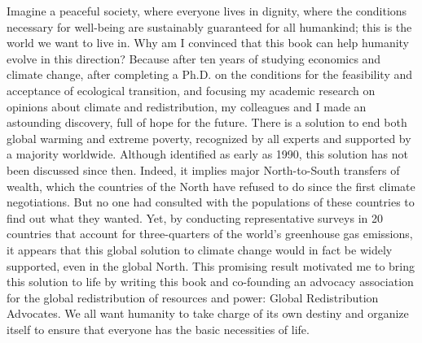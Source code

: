 \documentclass[a5paper,english,openany]{memoir}
\begin{document}
Imagine a peaceful society, where everyone lives in dignity, where the conditions necessary for well-being are sustainably guaranteed for all humankind; this is the world we want to live in.
Why am I convinced that this book can help humanity evolve in this direction? Because after ten years of studying economics and climate change, after completing a Ph.D. on the conditions for the feasibility and acceptance of ecological transition, %
and focusing my academic research on opinions about climate and redistribution, my colleagues and I made an astounding discovery, full of hope for the future. %
There is a solution to end both global warming and extreme poverty, recognized by all %
experts and supported by a majority worldwide. 
Although identified as early as 1990, this solution has not been discussed 
since then. Indeed, it implies major North-to-South %
transfers of wealth, which the countries of the North have refused to do since the first climate negotiations. But no one had consulted with the populations of these countries to find out what they wanted. Yet, %
by conducting representative surveys in 20 countries that account for three-quarters of the world's greenhouse gas emissions, it appears that this global solution to climate change would in fact be widely supported, even in the global North. 
This promising result motivated me to bring this solution to life by writing this book and co-founding an advocacy association for the global redistribution of resources and power: %
Global Redistribution Advocates.
We all want humanity to take charge of its own destiny and organize %
itself to ensure that everyone has the basic necessities of life.%
\end{document}
